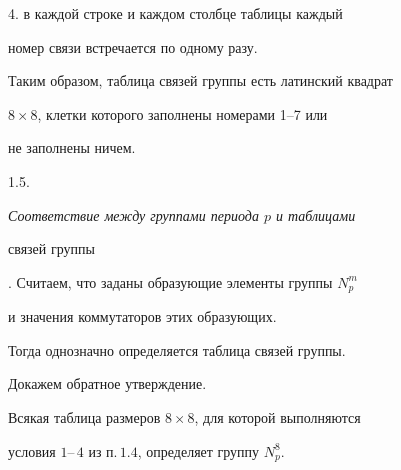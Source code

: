 4. в каждой строке и каждом столбце таблицы каждый


номер связи встречается по одному разу.





Таким образом, таблица связей группы есть латинский квадрат


$8\times 8$, клетки которого заполнены номерами 1--7 или


не заполнены ничем.


\medskip





1.5. {\it Соответствие между группами периода $p$ и таблицами


связей группы}. Считаем, что заданы образующие элементы группы $N^m_p$


и значения коммутаторов этих образующих. 


Тогда однозначно определяется таблица связей группы.





Докажем обратное утверждение.








\begin{thm}


Всякая таблица размеров $8\times 8$, для которой выполняются


условия $1$--\,$4$ из п.\,$1.4$, определяет группу $N^8_p$.


\end{thm}








